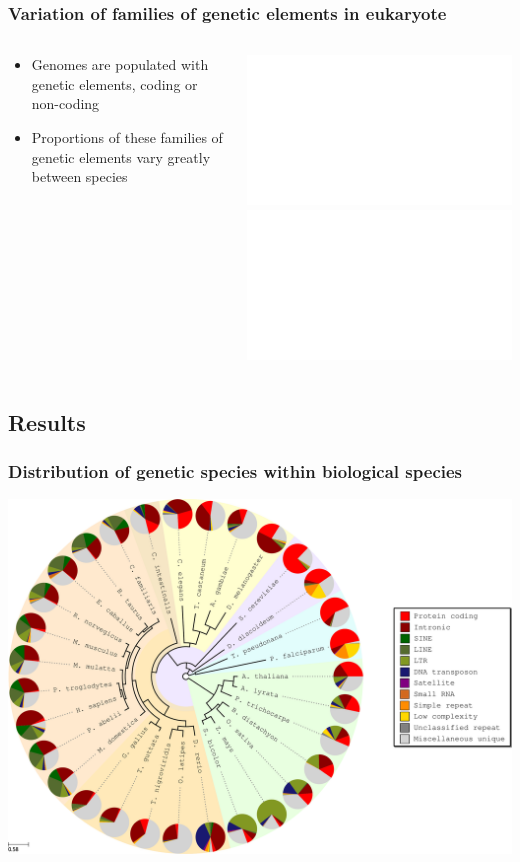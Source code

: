 \documentclass[hyperref={pagebackref=true},table]{beamer}
\begin{document}
\begin{frame}
  \frametitle{Variation of families of genetic elements in eukaryote}
  \begin{columns}[T]
    \begin{column}{0.32\textwidth}
      \begin{minipage}[c][.75\textheight][c]{\linewidth}
        \begin{itemize}
        \item<1-> Genomes are populated with genetic elements, coding
          or non-coding
        \item<2> Proportions of these families of genetic elements
          vary greatly between species
        \end{itemize}
      \end{minipage}
  \end{column}
    \begin{column}{0.68\textwidth}
      \begin{block}{}
        \includegraphics<1>[width=\textwidth]{pictures/Intro/prop_rep.pdf}
        \includegraphics<2->[width=\textwidth]{pictures/Intro/prop_transposons.pdf}
      \end{block}
    \end{column}
    
  \end{columns}
  
\end{frame}


\subsection{Results}

\begin{frame}
  \frametitle{Distribution of genetic species within biological species}
  \begin{center}
   \includegraphics[width=.92\textwidth]{pictures/untbgen/prop_genetic_species.pdf}
  \end{center}
\end{frame}
\end{document}
